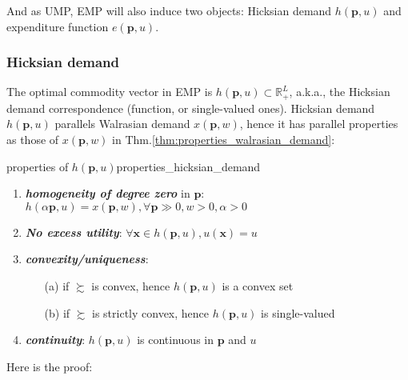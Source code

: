 And as UMP, EMP will also induce two objects: Hicksian demand $h(\mathbf{p},u)$ and expenditure function $e(\mathbf{p},u)$.

\subsubsection*{Hicksian demand}
The optimal commodity vector in EMP is $h(\mathbf{p},u)\subset\mathbb{R}^L_+$, a.k.a., the Hicksian demand correspondence (function, or single-valued ones). Hicksian demand $h(\mathbf{p},u)$ parallels Walrasian demand $ x(\mathbf{p},w)$, hence it has parallel properties as those of $ x(\mathbf{p},w)$ in Thm.\ref{thm:properties_walrasian_demand}:
\begin{theorem}{properties of $h(\mathbf{p},u)$}{properties_hicksian_demand}
    \begin{enumerate}
        \item \textit{\textbf{homogeneity of degree zero}} in $\mathbf{p}$: $h(\alpha\mathbf{p},u)= x(\mathbf{p},w),\forall \mathbf{p}\gg 0,w>0,\alpha>0$
        \item \textit{\textbf{No excess utility}}: $\forall \mathbf{x}\in h(\mathbf{p},u), u(\mathbf{x})=u$
        \item \textit{\textbf{convexity/uniqueness}}:
        \begin{enumerate}
            \item[(a)] if $\succsim$ is convex, hence $ h(\mathbf{p},u)$ is a convex set
            \item[(b)] if $\succsim$ is strictly convex, hence $ h(\mathbf{p},u)$ is single-valued    
        \end{enumerate}
        \item \textit{\textbf{continuity}}: $h(\mathbf{p},u)$ is continuous in $\mathbf{p}$ and $u$
    \end{enumerate}
\end{theorem}
Here is the proof:
